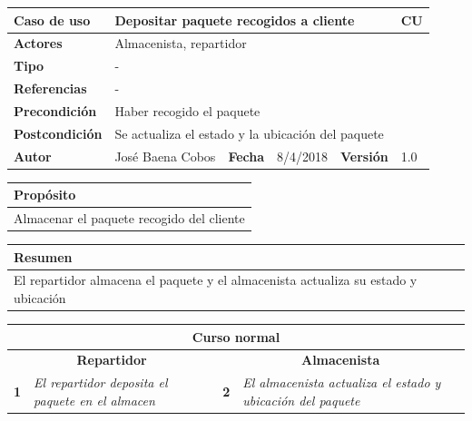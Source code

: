 \documentclass[12pt,spanish]{article}
\begin{document}
\begin{table}[H]
	\centering
	\begin{tabular}{|m{3cm}|m{4cm}|m{2cm}|m{2cm}|m{2cm}|m{1cm}|}
		\hline
		\textbf{Caso de uso} &  \multicolumn{4}{m{11cm}|}{Depositar paquete recogidos a cliente} \vline &  \cellcolor{gray!40}CU\arabic{contadorCU}  \stepcounter{contadorCU} \\
		\hline
		\textbf{Actores} & \multicolumn{5}{m{11cm}|}{Almacenista, repartidor} \\
		\hline
		\textbf{Tipo} & \multicolumn{5}{m{11cm}|}{-} \\
		\hline
		\textbf{Referencias} &\multicolumn{5}{m{11cm}|}{-} \\
		\hline
		\textbf{Precondición} & \multicolumn{5}{m{11cm}|}{Haber recogido el paquete} \\
		\hline
		\textbf{Postcondición} & \multicolumn{5}{m{11cm}|}{Se actualiza el estado y la ubicación del paquete} \\
		\hline
		\textbf{Autor} & José Baena Cobos & \textbf{Fecha} & 8/4/2018 & \textbf{Versión} & 1.0 \\
		\hline
	\end{tabular}
	
	\vspace{1cm}
	
	\begin{tabular}{|m{16.2cm}|}
		\hline
		\textbf{Propósito} \\
		\hline
		Almacenar el paquete recogido del cliente \\
		\hline
	\end{tabular}
	
	\vspace{1cm}
	
	\begin{tabular}{|m{16.2cm}|}
		\hline
		\textbf{Resumen} \\
		\hline
		El repartidor almacena el paquete y el almacenista actualiza su estado y ubicación\\
		\hline
	\end{tabular}
	
	\vspace{1cm}
	
	\begin{tabular}{|m{5pt}|m{7.33cm}|m{5pt}|m{7.33cm}|}
		\hline
		\multicolumn{4}{|c|}{\textbf{Curso normal}} \\
		\hline
		\multicolumn{2}{|c}{\textbf{Repartidor}} & \multicolumn{2}{|c|}{\textbf{Almacenista}} \\
		\hline
		\textbf{1} & \textit{El repartidor deposita el paquete en el almacen} & \textbf{2} & \textit{El almacenista actualiza el estado y ubicación del paquete} \\
		\hline
		

\end{tabular}
\end{table}
\end{document}
